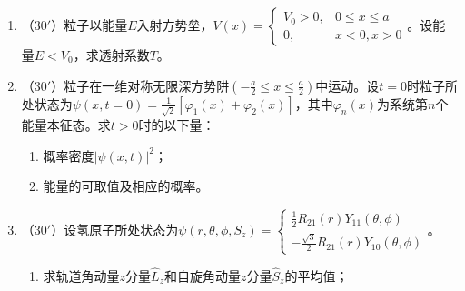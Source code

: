 


\begin{enumerate}
	\item
（$30'$）粒子以能量$E$入射方势垒，$V(x)=\begin{cases}V_0>0,&0\le x\le a\\0,&x<0,x>0\end{cases}$。设能量$E<V_0$，求透射系数$T$。


\banswer{
	
}


\item 
（$30'$）粒子在一维对称无限深方势阱$(-\frac{a}{2}\le x\le \frac{a}{2})$中运动。设$t=0$时粒子所处状态为$\psi(x,t=0)=\frac{1}{\sqrt2}[\varphi_1(x)+\varphi_2(x)]$，其中$\varphi_n(x)$为系统第$n$个能量本征态。求$t>0$时的以下量：
\begin{enumerate}
	\item
概率密度$|\psi(x,t)|^2$；

\item 
能量的可取值及相应的概率。
	
\end{enumerate}


\banswer{
	
}


\item 
（$30'$）设氢原子所处状态为$\psi(r,\theta,\phi,S_z)=\begin{cases}\frac{1}{2}R_{21}(r)Y_{11}(\theta,\phi)\\-\frac{\sqrt3}{2}R_{21}(r)Y_{10}(\theta,\phi)\end{cases}$。
\begin{enumerate}
	\item
求轨道角动量$z$分量$\hat{L}_z$和自旋角动量$z$分量$\hat{S}_z$的平均值；


\end{enumerate}
\end{enumerate}
